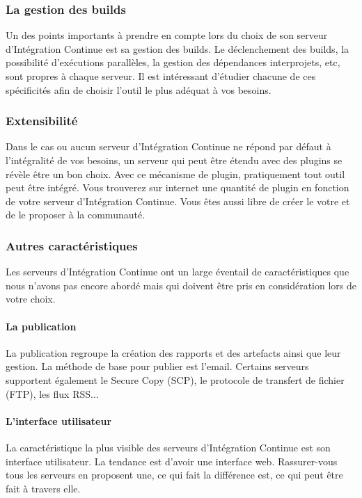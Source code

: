       \subsubsection{La gestion des builds}
      Un des points importants à prendre en compte lors du choix de son serveur d'Intégration Continue est sa gestion des builds. Le déclenchement des builds, la possibilité d'exécutions parallèles, la gestion des dépendances interprojets, etc, sont propres à chaque serveur. Il est intéressant d'étudier chacune de ces spécificités afin de choisir l'outil le plus adéquat à vos besoins.

      \subsubsection{Extensibilité}
      Dans le cas ou aucun serveur d'Intégration Continue ne répond par défaut à l'intégralité de vos besoins, un serveur qui peut être étendu avec des plugins se révèle être un bon choix. Avec ce mécanisme de plugin, pratiquement tout outil peut être intégré. Vous trouverez sur internet une quantité de plugin en fonction de votre serveur d'Intégration Continue. Vous êtes aussi libre de créer le votre et de le proposer à la communauté.

      \subsubsection{Autres caractéristiques}
      Les serveurs d'Intégration Continue ont un large éventail de caractéristiques que nous n'avons pas encore abordé mais qui doivent être pris en considération lors de votre choix.
      \paragraph{La publication} La publication regroupe la création des rapports et des artefacts ainsi que leur gestion. La méthode de base pour publier est l'email. Certains serveurs supportent également le Secure Copy (SCP), le protocole de transfert de fichier (FTP), les flux RSS...
      \paragraph{L'interface utilisateur} La caractéristique la plus visible des serveurs d'Intégration Continue est son interface utilisateur. La tendance est d'avoir une interface web. Rassurer-vous tous les serveurs en proposent une, ce qui fait la différence est, ce qui peut être fait à travers elle.

